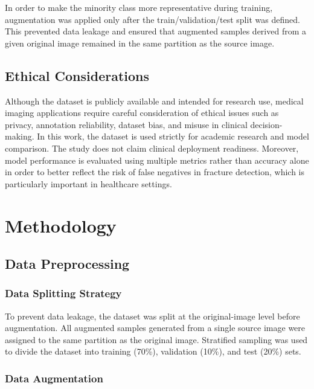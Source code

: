 \documentclass[conference]{IEEEtran}
\begin{document}
In order to make the minority class more representative during training, augmentation was applied only after the train/validation/test split was defined. This prevented data leakage and ensured that augmented samples derived from a given original image remained in the same partition as the source image.

\subsection{Ethical Considerations}

Although the dataset is publicly available and intended for research use, medical imaging applications require careful consideration of ethical issues such as privacy, annotation reliability, dataset bias, and misuse in clinical decision-making. In this work, the dataset is used strictly for academic research and model comparison. The study does not claim clinical deployment readiness. Moreover, model performance is evaluated using multiple metrics rather than accuracy alone in order to better reflect the risk of false negatives in fracture detection, which is particularly important in healthcare settings.

\section{Methodology}

\subsection{Data Preprocessing}

\subsubsection{Data Splitting Strategy}

To prevent data leakage, the dataset was split at the original-image level before augmentation. All augmented samples generated from a single source image were assigned to the same partition as the original image. Stratified sampling was used to divide the dataset into training (70\%), validation (10\%), and test (20\%) sets.

\subsubsection{Data Augmentation}
\end{document}
